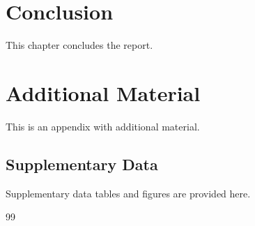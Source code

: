 \documentclass{report}
\begin{document}
\chapter{Conclusion}
\label{chap:concl}

This chapter concludes the report.




\appendix
\chapter{Additional Material}
\label{app:A}

This is an appendix with additional material.

\section{Supplementary Data}

Supplementary data tables and figures are provided here.

\begin{thebibliography}{99}
\addtolength{\itemsep}{-0.5ex}


\end{thebibliography}
\end{document}
